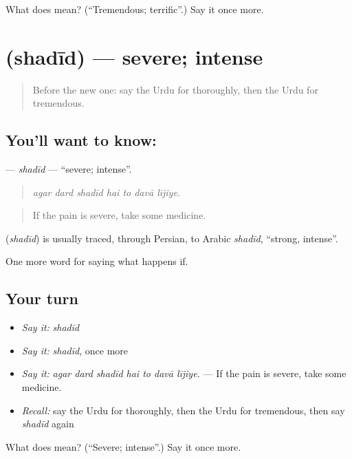 \begin{tcolorbox}[breakable,colback=teal!4,colframe=teal!35!black,title={Before you move on}]
What does  mean? (\textquotedblleft{}Tremendous; terrific\textquotedblright{}.) Say it once more.
\end{tcolorbox}
\section[\texorpdfstring{\ur{شدید} (shadīd)}{شدید (shadīd)}]{ (shadīd) — severe; intense}

\label{lesson:UR-C375-shadid}



\begin{quote}
Before the new one: say the Urdu for thoroughly, then the Urdu for tremendous.
\end{quote}

\subsection*{You'll want to know: }
\textbf{} — \emph{shadīd} — \textquotedblleft{}severe; intense\textquotedblright{}.

\begin{quote}
      
\end{quote}

\begin{quote}
\emph{agar dard shadīd hai to davā lījiye.}
\end{quote}

\begin{quote}
If the pain is severe, take some medicine.
\end{quote}

\begin{cousinweb}
\textbf{} (\emph{shadīd}) is usually traced, through Persian, to Arabic \emph{shadīd}, \textquotedblleft{}strong, intense\textquotedblright{}.
\end{cousinweb}

\begin{grammarlens}[title={What you've built}]
One more word for saying what happens if.
\end{grammarlens}

\subsection*{Your turn}
\begin{itemize}
\raggedright
  \item \emph{Say it:} \emph{shadīd}
  \item \emph{Say it:} \emph{shadīd}, once more
  \item \emph{Say it:} \emph{agar dard shadīd hai to davā lījiye.} — If the pain is severe, take some medicine.
  \item \emph{Recall:} say the Urdu for thoroughly, then the Urdu for tremendous, then say \emph{shadīd} again
\end{itemize}

\begin{tcolorbox}[breakable,colback=teal!4,colframe=teal!35!black,title={Before you move on}]
What does  mean? (\textquotedblleft{}Severe; intense\textquotedblright{}.) Say it once more.
\end{tcolorbox}
